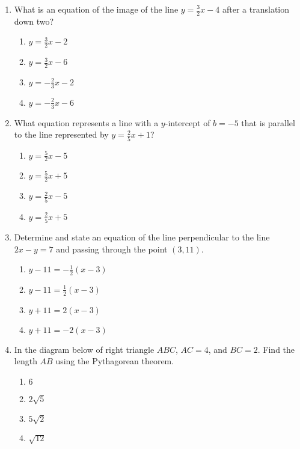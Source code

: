 \begin{enumerate}
\item What is an equation of the image of the line $y=\frac{3}{2}x-4$ after a translation down two?
\begin{multicols}{2}
  \begin{enumerate}
    \item $y=\frac{3}{2}x-2$
    \item $y=\frac{3}{2}x-6$
    \item $y=-\frac{2}{3}x-2$
    \item $y=-\frac{2}{3}x-6$
  \end{enumerate}
\end{multicols}

\newpage
\item What equation represents a line with a $y$-intercept of $b=-5$ that is parallel to the line represented by $y=\frac{2}{5}x+1$?
  \begin{multicols}{2}
    \begin{enumerate}
      \item $y=\frac{5}{2}x-5$
      \item $y=\frac{5}{2}x+5$
      \item $y=\frac{2}{5}x-5$
      \item $y=\frac{2}{5}x+5$
    \end{enumerate}
  \end{multicols}

\item Determine and state an equation of the line perpendicular to the line\\ $2x-y=7$ and passing through the point $(3,11)$.
  \begin{multicols}{2}
    \begin{enumerate}
      \item $y-11=-\frac{1}{2}(x-3)$
      \item $y-11=\frac{1}{2}(x-3)$ 
      \item $y+11=2(x-3)$
      \item $y+11=-2(x-3)$
    \end{enumerate}
  \end{multicols}

\item In the diagram below of right triangle $ABC$, $AC=4$, and $BC=2$. Find the length $AB$ using the Pythagorean theorem.
  \begin{multicols}{2}
    \begin{enumerate}
      \item $6$
      \item $2\sqrt{5}$ 
      \item $5\sqrt{2}$
      \item $\sqrt{12}$ 
    \end{enumerate}
  \end{multicols}


\end{enumerate}
